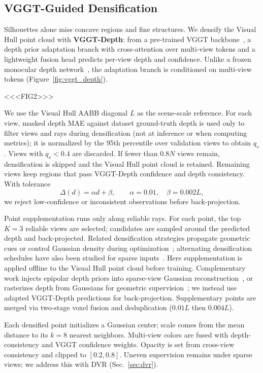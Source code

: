 \subsection{VGGT-Guided Densification}
\label{sec:depth_densify}

Silhouettes alone miss concave regions and fine structures. We densify the Visual Hull point cloud with \textbf{VGGT-Depth}: from a pre-trained VGGT backbone~\cite{Wang25_VGGT}, a depth prior adaptation branch with cross-attention over multi-view tokens and a lightweight fusion head predicts per-view depth and confidence. Unlike a frozen monocular depth network~\cite{Yang24_DepthAnythingV2}, the adaptation branch is conditioned on multi-view tokens (Figure~\ref{fig:vggt_depth}).

<<<FIG2>>>

We use the Visual Hull AABB diagonal $L$ as the scene-scale reference. For each view, masked depth MAE against dataset ground-truth depth is used only to filter views and rays during densification (not at inference or when computing metrics); it is normalized by the 95th percentile over validation views to obtain $q_v$. Views with $q_v<0.4$ are discarded. If fewer than $0.8N$ views remain, densification is skipped and the Visual Hull point cloud is retained. Remaining views keep regions that pass VGGT-Depth confidence and depth consistency. With tolerance
\begin{equation}
\label{eq:delta_d}
\Delta(d)=\alpha d+\beta,\qquad
\alpha=0.01,\quad \beta=0.002L,
\end{equation}
we reject low-confidence or inconsistent observations before back-projection.

Point supplementation runs only along reliable rays. For each point, the top $K=3$ reliable views are selected; candidates are sampled around the predicted depth and back-projected. Related densification strategies propagate geometric cues or control Gaussian density during optimization~\cite{Cheng24_GaussianPro,Zhou26_GDAGS}; alternating densification schedules have also been studied for sparse inputs~\cite{Patle25_ADGS}. Here supplementation is applied offline to the Visual Hull point cloud before training. Complementary work injects epipolar depth priors into sparse-view Gaussian reconstruction~\cite{Zheng25_NexusGS}, or rasterizes depth from Gaussians for geometric supervision~\cite{Zhang24_RaDeGS}; we instead use adapted VGGT-Depth predictions for back-projection. Supplementary points are merged via two-stage voxel fusion and deduplication ($0.01L$ then $0.004L$).

Each densified point initializes a Gaussian center; scale comes from the mean distance to its $k=8$ nearest neighbors. Multi-view colors are fused with depth-consistency and VGGT confidence weights. Opacity is set from cross-view consistency and clipped to $[0.2,0.8]$. Uneven supervision remains under sparse views; we address this with DVR (Sec.~\ref{sec:dvr}).
